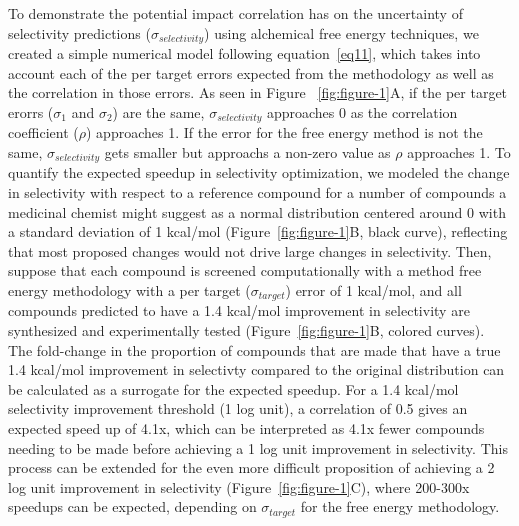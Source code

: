 \documentclass[phd,tocprelim]{cornell}
\begin{document}
To demonstrate the potential impact correlation has on the uncertainty of selectivity predictions ($\sigma_{selectivity}$) using alchemical free energy techniques, we created a simple numerical model following equation~\ref{eq11}, which takes into account each of the per target errors expected from the methodology as well as the correlation in those errors. As seen in Figure ~\ref{fig:figure-1}A, if the per target erorrs ($\sigma_1$ and $\sigma_2$) are the same, $\sigma_{selectivity}$ approaches 0 as the correlation coefficient ($\rho$) approaches 1. If the error for the free energy method is not the same, $\sigma_{selectivity}$ gets smaller but approachs a non-zero value as $\rho$ approaches 1. 
To quantify the expected speedup in selectivity optimization, we modeled the change in selectivity with respect to a reference compound for a number of compounds a medicinal chemist might suggest as a normal distribution centered around 0 with a standard deviation of 1 kcal/mol (Figure~\ref{fig:figure-1}B, black curve), reflecting that most proposed changes would not drive large changes in selectivity. Then, suppose that each compound is screened computationally with a method free energy methodology with a per target ($\sigma_{target}$) error of 1 kcal/mol, and all compounds predicted to have a 1.4 kcal/mol improvement in selectivity are synthesized and experimentally tested (Figure~\ref{fig:figure-1}B, colored curves). The fold-change in the proportion of compounds that are made that have a true 1.4 kcal/mol improvement in selectivty compared to the original distribution can be calculated as a surrogate for the expected speedup. For a 1.4 kcal/mol selectivity improvement threshold (1 log unit), a correlation of 0.5 gives an expected speed up of 4.1x, which can be interpreted as 4.1x fewer compounds needing to be made before achieving a 1 log unit improvement in selectivity. This process can be extended for the even more difficult proposition of achieving a 2 log unit improvement in selectivity (Figure~\ref{fig:figure-1}C), where 200-300x speedups can be expected, depending on $\sigma_{target}$ for the free energy methodology. 
\end{document}
